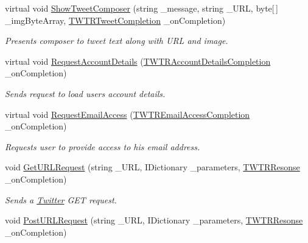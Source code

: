 \begin{DoxyCompactItemize}
virtual void \hyperlink{class_voxel_busters_1_1_native_plugins_1_1_twitter_aaa7380eea4791587c171d201b79a6567}{Show\+Tweet\+Composer} (string \+\_\+message, string \+\_\+\+U\+R\+L, byte\mbox{[}$\,$\mbox{]} \+\_\+img\+Byte\+Array, \hyperlink{class_voxel_busters_1_1_native_plugins_1_1_twitter_afc6b9ce57f190495125926ab9a0a2986}{T\+W\+T\+R\+Tweet\+Completion} \+\_\+on\+Completion)
\begin{DoxyCompactList}\small\item\em Presents composer to tweet text along with U\+R\+L and image. \end{DoxyCompactList}\item 
virtual void \hyperlink{class_voxel_busters_1_1_native_plugins_1_1_twitter_ac8b89da6d5f00af4292bcab518f3a33f}{Request\+Account\+Details} (\hyperlink{class_voxel_busters_1_1_native_plugins_1_1_twitter_a547ee925356415ce1472068ed1011ce3}{T\+W\+T\+R\+Account\+Details\+Completion} \+\_\+on\+Completion)
\begin{DoxyCompactList}\small\item\em Sends request to load users account details. \end{DoxyCompactList}\item 
virtual void \hyperlink{class_voxel_busters_1_1_native_plugins_1_1_twitter_a791224d4484a3d54d96092c3f91d8404}{Request\+Email\+Access} (\hyperlink{class_voxel_busters_1_1_native_plugins_1_1_twitter_ae65acbb90b23780b10cc2881d1739bb7}{T\+W\+T\+R\+Email\+Access\+Completion} \+\_\+on\+Completion)
\begin{DoxyCompactList}\small\item\em Requests user to provide access to his email address. \end{DoxyCompactList}\item 
void \hyperlink{class_voxel_busters_1_1_native_plugins_1_1_twitter_a2fbc52d6ceac20cb210f6b6e0224259c}{Get\+U\+R\+L\+Request} (string \+\_\+\+U\+R\+L, I\+Dictionary \+\_\+parameters, \hyperlink{class_voxel_busters_1_1_native_plugins_1_1_twitter_a75983752eed2d648d967943ca91eb9aa}{T\+W\+T\+R\+Resonse} \+\_\+on\+Completion)
\begin{DoxyCompactList}\small\item\em Sends a \hyperlink{class_voxel_busters_1_1_native_plugins_1_1_twitter}{Twitter} G\+E\+T request. \end{DoxyCompactList}\item 
void \hyperlink{class_voxel_busters_1_1_native_plugins_1_1_twitter_a24e6281b9778b4dcfb6b35b5522013ad}{Post\+U\+R\+L\+Request} (string \+\_\+\+U\+R\+L, I\+Dictionary \+\_\+parameters, \hyperlink{class_voxel_busters_1_1_native_plugins_1_1_twitter_a75983752eed2d648d967943ca91eb9aa}{T\+W\+T\+R\+Resonse} \+\_\+on\+Completion)

\end{DoxyCompactItemize}
